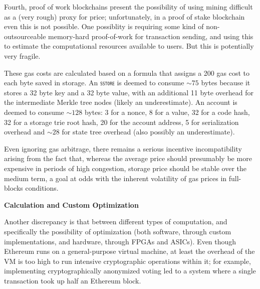 \documentclass[12pt, final]{article}
\newcommand{\opcode}[1]{\textsc{\texttt{#1}}}
\begin{document}
Fourth, proof of work blockchains present the possibility of using mining difficult as a (very rough) proxy for price; unfortunately, in a proof of stake blockchain even this is not possible.  One possiblity is requiring some kind of non-outsourceable memory-hard proof-of-work for transaction sending, and using this to estimate the computational resources available to users.  But this is potentially very fragile.


These gas costs are calculated based on a formula that assigns a 200 gas cost to each byte saved in storage. An \opcode{sstore} is deemed to consume $\sim\!75$ bytes because it stores a 32 byte key and a 32 byte value, with an additional 11 byte overhead for the intermediate Merkle tree nodes (likely an underestimate). An account is deemed to consume $\sim\!128$ bytes: 3 for a nonce, 8 for a value, 32 for a code hash, 32 for a storage trie root hash, 20 for the account address, 5 for serialization overhead and $\sim\!28$ for state tree overhead (also possibly an underestimate). 

Even ignoring gas arbitrage, there remains a serious incentive incompatibility arising from the fact that, whereas the average price should presumably be more expensive in periods of high congestion, storage price should be stable over the medium term, a goal at odds with the inherent volatility of gas prices in full-blocks conditions. 

\textbf{Calculation and Custom Optimization}

Another discrepancy is that between different types of computation, and specifically the possibility of optimization (both software, through custom implementations, and hardware, through FPGAs and ASICs). Even though Ethereum runs on a general-purpose virtual machine, at least the overhead of the VM is too high to run intensive cryptographic operations within it; for example, implementing cryptographically anonymized voting led to a system where a single transaction took up half an Ethereum block. \cite{fc17ai}
\end{document}

